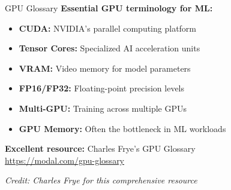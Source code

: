 \documentclass[../main.tex]{subfiles}
\begin{document}
\begin{frame}{GPU Glossary}
    \textbf{Essential GPU terminology for ML:}

    \begin{itemize}
        \item \textbf{CUDA:} NVIDIA's parallel computing platform
        \item \textbf{Tensor Cores:} Specialized AI acceleration units
        \item \textbf{VRAM:} Video memory for model parameters
        \item \textbf{FP16/FP32:} Floating-point precision levels
        \item \textbf{Multi-GPU:} Training across multiple GPUs
        \item \textbf{GPU Memory:} Often the bottleneck in ML workloads
    \end{itemize}

    \bigskip

    \textbf{Excellent resource:} Charles Frye's GPU Glossary \\
    \url{https://modal.com/gpu-glossary}

    \bigskip

    \textit{Credit: Charles Frye for this comprehensive resource}
\end{frame}
\end{document}
